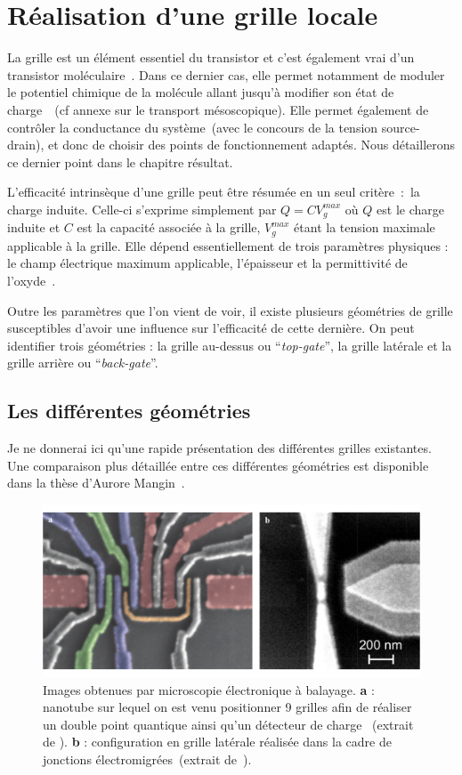 \section{Réalisation d'une grille locale}
La grille est un élément essentiel du transistor et c'est également vrai d'un transistor moléculaire~\cite{Datta2009,Zant2006}. Dans ce dernier cas, elle permet notamment de moduler le potentiel chimique de la molécule allant jusqu'à modifier son état de charge~\cite{Beenakker1991,Wiel2002,Hanson2007}~(cf annexe sur le transport mésoscopique). Elle permet également de contrôler la conductance du système~(avec le concours de la tension source-drain), et donc de choisir des points de fonctionnement adaptés. Nous détaillerons ce dernier point dans le chapitre résultat. 

L'efficacité intrinsèque d'une grille peut être résumée en un seul critère~:~la charge induite. Celle-ci s'exprime simplement par $Q = CV_g^{max}$ où $Q$ est le charge induite et $C$ est la capacité associée à la grille, $V_g^{max}$ étant la tension maximale applicable à la grille. Elle dépend essentiellement de trois paramètres physiques : le champ électrique maximum applicable, l'épaisseur et la permittivité de l'oxyde~\cite{Biercuk2003}. 

Outre les paramètres que l'on vient de voir, il existe plusieurs géométries de grille susceptibles d'avoir une influence sur l’efficacité de cette dernière. On peut identifier trois géométries : la grille au-dessus ou  ``\textit{top-gate}'', la grille latérale et la grille arrière ou  ``\textit{back-gate}''.

\subsection{Les différentes géométries}
Je ne donnerai ici qu'une rapide présentation des différentes grilles existantes. Une comparaison plus détaillée entre ces différentes géométries est disponible dans la thèse d'Aurore Mangin~\cite{Aurore2009}.

\begin{figure}
\centering \includegraphics[scale=0.45]{Fabrication/Gateconf/GateConf.pdf}
\caption{Images obtenues par microscopie électronique à balayage. \textbf{a} : nanotube sur lequel on est venu positionner 9 grilles afin de réaliser un double point quantique ainsi qu'un détecteur de charge ~(extrait de \cite{Churchill2009}). \textbf{b} : configuration en grille latérale réalisée dans la cadre de jonctions électromigrées~(extrait de~\cite{Aurore2009}).}
\label{GateConf}
\end{figure}


